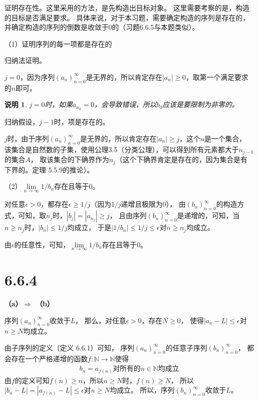 \documentclass{article}
\theoremstyle{mystyle}
\newtheorem*{zremark}{说明}
\begin{document}
证明存在性。这里采用的方法，是先构造出目标对象。
这里需要考察的是，构造的目标是否满足要求。
具体来说，对于本习题，需要确定构造的序列是存在的，并确定构造的序列的倒数是收敛于$0$的（习题6.6.5与本题类似）。

（1）证明序列的每一项都是存在的

归纳法证明。

$j=0$，因为序列$(a_n)_{n=0}^\infty$是无界的，所以肯定存在$|a_n| \geq 0$，取第一个满足要求的$n$即可。

\begin{zgraytheorem}
  \begin{zremark}
    $j=0$时，如果$a_{n_0}=0$，会导致错误，所以$b_0$应该是要限制为非零的。
  \end{zremark}
\end{zgraytheorem}

归纳假设，$j-1$时，项是存在的。

$j$时，由于序列$(a_n)_{n=0}^\infty$是无界的，所以肯定存在$|a_n| \geq j$，这个$n$是一个集合，
该集合是自然数的子集，使用公理3.5（分类公理），可以得到所有元素都大于$n_{j-1}$的集合$A$，
取该集合的下确界作为$n_j$（这个下确界肯定是存在的，因为集合是有下界的。定理 5.5.9的推论）。

（2）$\lim\limits_{n \rightarrow \infty}1/b_n$存在且等于$0$。

对任意$\epsilon > 0$，都存在$\epsilon \geq 1/j$（因为$1/j$递增且极限为$0$），
由$(b_n)_{n=0}^\infty$的构造方式，可知，取$n_j$时，$|b_j| = |a_{n_j}| \geq j$，
且由序列$(b_n)_{n=0}^\infty$是递增的，可知，当$n \geq n_j$时，$|b_n| \leq 1/j$均成立，
于是$|1/b_n| \leq 1/j \leq \epsilon$对$n \geq n_j$均成立。

由$\epsilon$的任意性，可知，$\lim\limits_{n \rightarrow \infty}1/b_n$存在且等于$0$。

\section*{6.6.4}

\textbf{（a）$\Rightarrow$ （b）}

序列$(a_n)_{n=0}^\infty$收敛于$L$，
那么，对任意$\epsilon > 0$，存在$N \geq 0$，
使得$|a_n - L| \leq \epsilon$对$n \geq N$均成立。

由子序列的定义（定义 6.6.1）可知，
序列$(a_n)_{n=0}^\infty$的任意子序列$(b_n)_{n=0}^\infty$，
都会存在一个严格递增的函数$f : \mathbb{N} \rightarrow \mathbb{N}$使得
\begin{align*}
  b_n = a_{f(n)} \text{对所有的$n \in \mathbb{N}$均成立}
\end{align*}
由$f$的定义可知$f(n) \geq n$，所以$n \geq N$时，$f(n) \geq N$，
所以$|b_n - L| = |a_{f(n)} - L | \leq \epsilon$对$n \geq N$均成立。
所以，序列$(b_n)_{n=0}^\infty$收敛于$L$。
\end{document}
